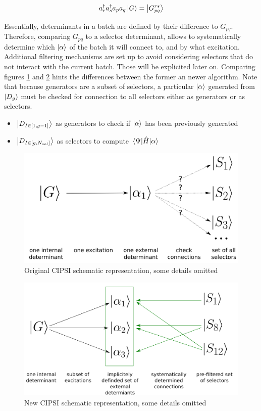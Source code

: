\documentclass[./thesis.tex]{subfiles}
\newcommand{\Gpqrs}{\ket{G^{rs}_{pq}}}
\begin{document}
\begin{equation}
a^\dagger_r a^\dagger_s a_p a_q  \ket G = \Gpqrs
\end{equation}

Essentially, determinants in a batch are defined by their difference to $G_{pq}$. Therefore, comparing $G_{pq}$ to a selector determinant, allows to systematically determine which ${\ket{\alpha}}$ of the batch it will connect to, and by what excitation. Additional filtering mechanisms are set up to avoid considering selectors that do not interact with the current batch. Those will be explicited later on. Comparing figures \ref{fig:old_cipsi} and \ref{fig:new_cipsi} hints the differences between the former an newer algorithm. Note that because generators are a subset of selectors, a particular ${\ket{\alpha}}$ generated from $\ket {D_g}$ must be checked for connection to all selectors either as generators or as selectors.

\begin{itemize}
\item
$\ket {D_{I \in [1,g-1]}}$ as generators to check if ${\ket{\alpha}}$ has been previously generated
\item
$\ket {D_{I \in [g,N_{sel}]}}$ as selectors to compute $\mel{\Psi}{\hat{H}}{\alpha}$
\end{itemize}


\begin{figure}[h!]
	\begin{center}
		\includegraphics[width=0.7\columnwidth]{figures/cipsi/old_cipsi}
		\caption{Original CIPSI schematic representation, some details omitted}
		\label{fig:old_cipsi}
	\end{center}
\end{figure}


\begin{figure}[h!]
	\begin{center}
		\includegraphics[width=0.7\columnwidth]{figures/cipsi/new_cipsi}
		\caption{New CIPSI schematic representation, some details omitted}
		\label{fig:new_cipsi}
	\end{center}
\end{figure}
\end{document}
